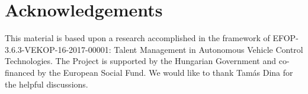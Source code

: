 \section*{Acknowledgements}

This material is based upon a research accomplished in the framework of
EFOP-3.6.3-VEKOP-16-2017-00001: Talent Management in Autonomous Vehicle Control
Technologies. The Project is supported by the Hungarian Government and
co-financed by the European Social Fund. We would like to thank Tamás Dina for
the helpful discussions.


